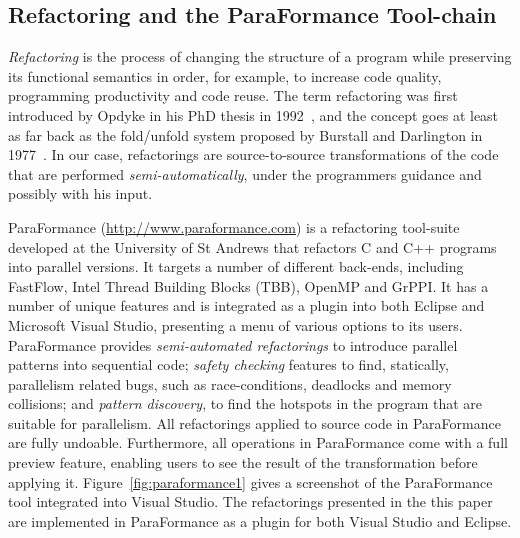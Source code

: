 \subsection{Refactoring and the ParaFormance Tool-chain}

\noindent
\emph{Refactoring} is the process of changing the structure of a program while preserving
its functional semantics in order, for example, to increase code quality, programming
productivity and code reuse. The term refactoring was first introduced by Opdyke in his PhD thesis in 1992~\cite{opdyke}, and the concept goes at least as far back as the fold/unfold system proposed by Burstall and Darlington in 1977~\cite{darlington77}. In our case, refactorings are source-to-source transformations of the code that are performed \emph{semi-automatically}, under the programmers guidance and possibly with his input. 

%
%
%

ParaFormance (\url{http://www.paraformance.com}) is a refactoring tool-suite developed at the University of St Andrews that refactors C and C++ programs into parallel versions. It targets a number of different back-ends, including FastFlow, Intel Thread Building Blocks (TBB), OpenMP and GrPPI. It has a number of unique features and is integrated as a plugin into both Eclipse and Microsoft Visual Studio, presenting a menu of various options to its users. ParaFormance provides \emph{semi-automated refactorings} to introduce parallel patterns into sequential code; \emph{safety checking} features to find, statically, parallelism related bugs, such as race-conditions, deadlocks and memory collisions; and \emph{pattern discovery}, to find the hotspots in the program that are suitable for parallelism. All refactorings applied to source code in ParaFormance are fully undoable. Furthermore, all operations in ParaFormance come with a full preview feature, enabling users to see the result of the transformation before applying it. Figure~\ref{fig:paraformance1} gives a screenshot of the ParaFormance tool integrated into Visual Studio. The refactorings presented in the this paper are implemented in ParaFormance as a plugin for both Visual Studio and Eclipse.

